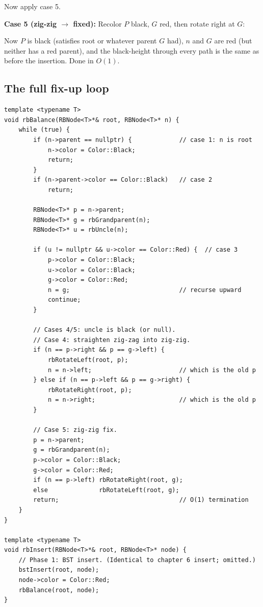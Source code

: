 \documentclass[11pt]{article}
\begin{document}
Now apply case 5.

\textbf{Case 5 (zig-zig $\to$ fixed):} Recolor $P$ black, $G$ red, then rotate right at $G$:

\begin{center}
\end{center}

Now $P$ is black (satisfies root or whatever parent $G$ had), $n$ and $G$ are red (but neither has a red parent), and the black-height through every path is the same as before the insertion. Done in $O(1)$.

\subsection*{The full fix-up loop}

\begin{lstlisting}
template <typename T>
void rbBalance(RBNode<T>*& root, RBNode<T>* n) {
    while (true) {
        if (n->parent == nullptr) {             // case 1: n is root
            n->color = Color::Black;
            return;
        }
        if (n->parent->color == Color::Black)   // case 2
            return;

        RBNode<T>* p = n->parent;
        RBNode<T>* g = rbGrandparent(n);
        RBNode<T>* u = rbUncle(n);

        if (u != nullptr && u->color == Color::Red) {  // case 3
            p->color = Color::Black;
            u->color = Color::Black;
            g->color = Color::Red;
            n = g;                              // recurse upward
            continue;
        }

        // Cases 4/5: uncle is black (or null).
        // Case 4: straighten zig-zag into zig-zig.
        if (n == p->right && p == g->left) {
            rbRotateLeft(root, p);
            n = n->left;                        // which is the old p
        } else if (n == p->left && p == g->right) {
            rbRotateRight(root, p);
            n = n->right;                       // which is the old p
        }

        // Case 5: zig-zig fix.
        p = n->parent;
        g = rbGrandparent(n);
        p->color = Color::Black;
        g->color = Color::Red;
        if (n == p->left) rbRotateRight(root, g);
        else              rbRotateLeft(root, g);
        return;                                 // O(1) termination
    }
}

template <typename T>
void rbInsert(RBNode<T>*& root, RBNode<T>* node) {
    // Phase 1: BST insert. (Identical to chapter 6 insert; omitted.)
    bstInsert(root, node);
    node->color = Color::Red;
    rbBalance(root, node);
}
\end{lstlisting}
\end{document}
